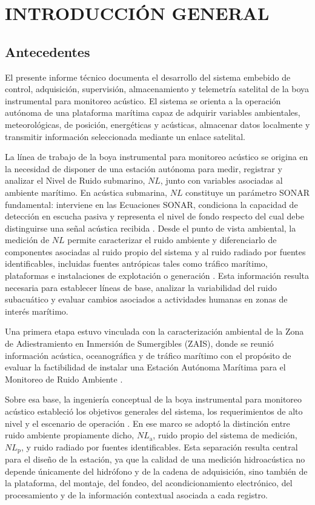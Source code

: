 \section{INTRODUCCIÓN GENERAL}
\label{sec:introduccion_general}

\subsection{Antecedentes}
\label{subsec:antecedentes}

El presente informe técnico documenta el desarrollo del sistema embebido de control, adquisición, supervisión, almacenamiento y telemetría satelital de la boya instrumental para monitoreo acústico. El sistema se orienta a la operación autónoma de una plataforma marítima capaz de adquirir variables ambientales, meteorológicas, de posición, energéticas y acústicas, almacenar datos localmente y transmitir información seleccionada mediante un enlace satelital.  

La línea de trabajo de la boya instrumental para monitoreo acústico se origina en la necesidad de disponer de una estación autónoma para medir, registrar y analizar el Nivel de Ruido submarino, \(NL\), junto con variables asociadas al ambiente marítimo. En acústica submarina, \(NL\) constituye un parámetro SONAR fundamental: interviene en las Ecuaciones SONAR, condiciona la capacidad de detección en escucha pasiva y representa el nivel de fondo respecto del cual debe distinguirse una señal acústica recibida \citep{URICK,UrickNL}. Desde el punto de vista ambiental, la medición de \(NL\) permite caracterizar el ruido ambiente y diferenciarlo de componentes asociadas al ruido propio del sistema y al ruido radiado por fuentes identificables, incluidas fuentes antrópicas tales como tráfico marítimo, plataformas e instalaciones de explotación o generación \citep{Urban2002}. Esta información resulta necesaria para establecer líneas de base, analizar la variabilidad del ruido subacuático y evaluar cambios asociados a actividades humanas en zonas de interés marítimo.

Una primera etapa estuvo vinculada con la caracterización ambiental de la Zona de Adiestramiento en Inmersión de Sumergibles (ZAIS), donde se reunió información acústica, oceanográfica y de tráfico marítimo con el propósito de evaluar la factibilidad de instalar una Estación Autónoma Marítima para el Monitoreo de Ruido Ambiente \citep{AS0215_ZAIS}.

Sobre esa base, la ingeniería conceptual de la boya instrumental para monitoreo acústico estableció los objetivos generales del sistema, los requerimientos de alto nivel y el escenario de operación \citep{AS0316_BoyaConceptual}. En ese marco se adoptó la distinción entre ruido ambiente propiamente dicho, \(NL_\mathrm{a}\), ruido propio del sistema de medición, \(NL_\mathrm{p}\), y ruido radiado por fuentes identificables. Esta separación resulta central para el diseño de la estación, ya que la calidad de una medición hidroacústica no depende únicamente del hidrófono y de la cadena de adquisición, sino también de la plataforma, del montaje, del fondeo, del acondicionamiento electrónico, del procesamiento y de la información contextual asociada a cada registro.

